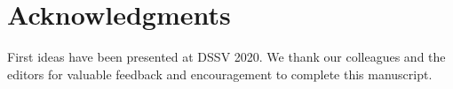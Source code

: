 \documentclass[article]{jdssv}\usepackage[]{graphicx}\usepackage[]{color}
\begin{document}
\section*{Acknowledgments}

First ideas have been presented at DSSV 2020. We thank our colleagues and the editors for valuable feedback and encouragement to complete this manuscript.






% 
% 
% 
% 

\end{document}
